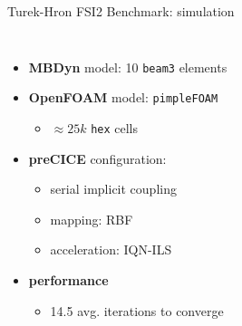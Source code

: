 \documentclass[10pt,t]{beamer}
\begin{document}
\begin{frame}{Turek-Hron FSI2 Benchmark: simulation}
\begin{columns}
\footnotesize
\begin{itemize}
    \item \textbf{MBDyn} model: 10 \texttt{beam3} elements
    \item \textbf{OpenFOAM} model: \texttt{pimpleFOAM}
    \begin{itemize}
        \item $\approx 25k$ \texttt{hex} cells
    \end{itemize}
    \item \textbf{preCICE} configuration:
    \begin{itemize}
        \item serial implicit coupling
        \item mapping: RBF
        \item acceleration: IQN-ILS
    \end{itemize}
    \item \textbf{performance}
    \begin{itemize}
        \item 14.5 avg. iterations to converge
    \end{itemize}
\end{itemize}

\end{columns}

\end{frame}
\end{document}
